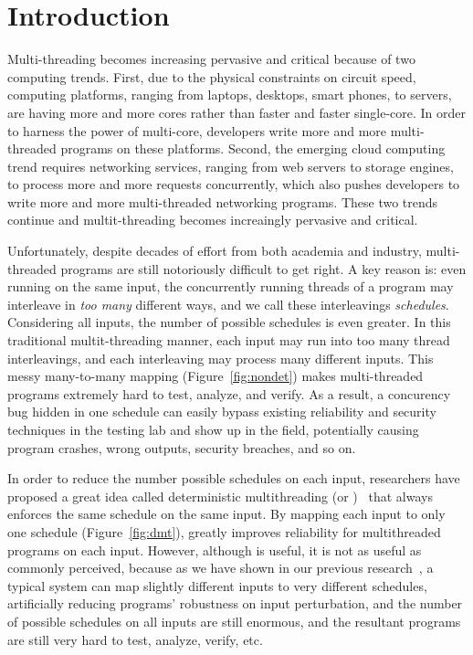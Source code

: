 \chapter{Introduction} \label{sec:intro}

Multi-threading becomes increasing pervasive and critical because of two 
computing trends. First, due to the physical constraints on circuit speed, 
computing platforms, ranging from laptops, desktops, smart phones, to servers, are having
more and more cores rather than faster and faster single-core. In order to 
harness the power of multi-core, developers write more and more multi-threaded programs on these platforms. 
Second, the emerging cloud computing trend requires networking services, ranging from 
web servers to storage engines, to process more and more requests concurrently, which also 
pushes developers to write more and more multi-threaded networking programs. These two trends continue and 
multit-threading becomes increaingly pervasive and critical.

Unfortunately, despite decades of effort from both academia and industry, 
multi-threaded programs are still notoriously difficult to get right. A key 
reason is: even running on the same input, the concurrently running threads of 
a program may interleave in \emph{too many} different ways, and we call these interleavings 
\emph{schedules}. Considering all inputs, the number of possible schedules is even greater. 
In this traditional multit-threading manner, each input may run into too many 
thread interleavings, and each interleaving may process many different inputs.
This messy many-to-many mapping (Figure~\ref{fig:nondet}) makes multi-threaded programs extremely
hard to test, analyze, and verify. As a result, a concurency bug hidden in one schedule can 
easily bypass existing reliability and security techniques in the testing lab and show up in the field, 
potentially causing program crashes, wrong outputs, security breaches, and so on.

In order to reduce the number possible schedules on each input, researchers 
have proposed a great idea called deterministic multithreading (or \dmt)~\cite{dthreads:sosp11,
dpj:oopsla09, dmp:asplos09, kendo:asplos09, coredet:asplos10} that 
always enforces the same schedule on the same input. By mapping each input to only 
one schedule (Figure~\ref{fig:dmt}), \dmt greatly improves reliability for multithreaded programs on each input.
However, although \dmt is useful, it is not as useful as commonly perceived, 
because as we have shown in our previous research~\cite{cui:tern:osdi10},
a typical \dmt system can map slightly different inputs to 
very different schedules, artificially reducing programs' robustness on input 
perturbation, and the number of possible schedules on all inputs are still 
enormous, and the resultant programs are still very hard to test, analyze, verify, etc.

